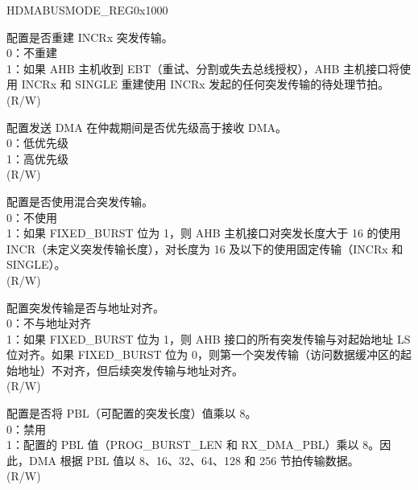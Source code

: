 

\begin{register}{H}{DMABUSMODE\_REG}{0x1000}\label{regdesc:DMABUSMODEREG}
%
%
%
%
%
%
%
%
%
%
%
%
%
%
%
\regnewline%
\begin{regdesc}\begin{reglist}
\item [DMAREBUILDINCRBURST] 配置是否重建 INCRx 突发传输。\\
0：不重建\\
1：如果 AHB 主机收到 EBT（重试、分割或失去总线授权），AHB 主机接口将使用 INCRx 和 SINGLE 重建使用 INCRx 发起的任何突发传输的待处理节拍。\\(R/W)
\item [DMATRANSMITPRIORITY] 配置发送 DMA 在仲裁期间是否优先级高于接收 DMA。\\
0：低优先级\\
1：高优先级\\ (R/W)
\item [DMAMIXEDBURST] 配置是否使用混合突发传输。\\
0：不使用\\
1：如果 FIXED\_BURST 位为 1，则 AHB 主机接口对突发长度大于 16 的使用 INCR（未定义突发传输长度），对长度为 16 及以下的使用固定传输（INCRx 和 SINGLE）。\\(R/W)
\item [DMAADDRALIBEA] 配置突发传输是否与地址对齐。\\
0：不与地址对齐\\
1：如果 FIXED\_BURST 位为 1，则 AHB 接口的所有突发传输与对起始地址 LS 位对齐。如果 FIXED\_BURST 位为 0，则第一个突发传输（访问数据缓冲区的起始地址）不对齐，但后续突发传输与地址对齐。\\(R/W)
\item [PBLX8\_MODE] 配置是否将 PBL（可配置的突发长度）值乘以 8。\\
0：禁用\\
1：配置的 PBL 值（PROG\_BURST\_LEN 和 RX\_DMA\_PBL）乘以 8。因此，DMA 根据 PBL 值以 8、16、32、64、128 和 256 节拍传输数据。\\ (R/W)

\item [见下页...]
\end{reglist}\end{regdesc}
\end{register}

